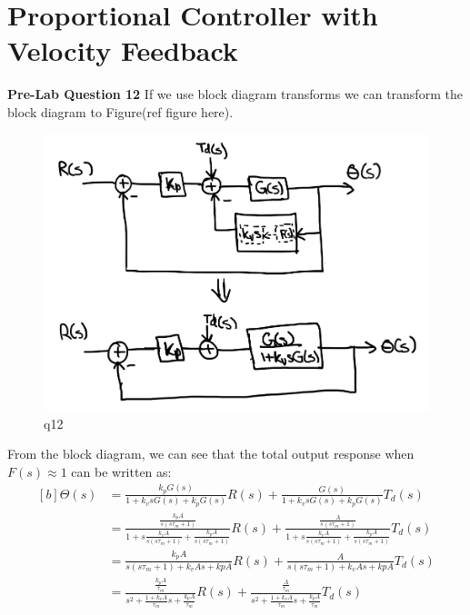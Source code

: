 \documentclass[12pt]{article}
\begin{document}
\section{Proportional Controller with Velocity Feedback}
\textbf{Pre-Lab Question 12}
If we use block diagram transforms we can transform the block diagram to Figure(ref figure here).
\begin{figure}
    \centering
    \includegraphics[width=\textwidth]{q12}
    \caption{\label{fig:12}q12}
\end{figure}
From the block diagram, we can see that the total output response when $F(s) \approx 1$ can be written as:
\begin{equation}
\begin{aligned}[b]
    \Theta(s) &= \frac{k_pG(s)}{1 + k_vsG(s) + k_pG(s)}R(s) + \frac{G(s)}{1 + k_vsG(s) + k_pG(s)}T_d(s) \\
    &= \frac{\frac{k_pA}{s(s\tau_m + 1)}}{1 + s\frac{k_vA}{s(s\tau_m + 1)} + \frac{k_pA}{s(s\tau_m + 1)}}R(s) + \frac{\frac{A}{s(s\tau_m + 1)}}{1 + s\frac{k_vA}{s(s\tau_m + 1)} + \frac{k_pA}{s(s\tau_m + 1)}}T_d(s) \\
    &= \frac{k_pA}{s(s\tau_m + 1) + k_vAs + kpA}R(s) + \frac{A}{s(s\tau_m + 1) + k_vAs + kpA}T_d(s) \\
    &= \frac{\frac{k_pA}{\tau_m}}{s^2 + \frac{1+k_vA}{\tau_m}s + \frac{k_pA}{\tau_m}}R(s) + \frac{\frac{A}{\tau_m}}{s^2 + \frac{1+k_vA}{\tau_m}s + \frac{k_pA}{\tau_m}}T_d(s)
\end{aligned}
\end{equation} 
\end{document}
